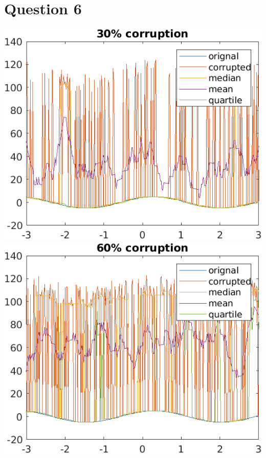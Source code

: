 \documentclass{article}
\theoremstyle{remark}
\begin{document}
\newpage

\section{Question 6}


\begin{center}
    \includegraphics{q6(1).png}
    \includegraphics{q6(2).png}
\end{center}
\end{document}
